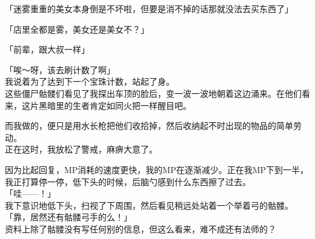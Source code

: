 「迷雾重重的美女本身倒是不坏啦，但要是消不掉的话那就没法去买东西了」

「店里全都是雾，美女还是美女不？」

「前辈，跟大叔一样」

「唉～呀，该去刷计数了啊」\\

我说着为了达到下一个宝珠计数，站起了身。\\

这些僵尸骷髅们看见了我探出车顶的脸后，变一波一波地朝着这边涌来。在他们看来，这片黑暗里的生者肯定如同火把一样醒目吧。

而我做的，便只是用水长枪把他们收拾掉，然后收纳起不时出现的物品的简单劳动。\\

正在这时，我放松了警戒，麻痹大意了。

因为比起回复，MP消耗的速度更快，我的MP在逐渐减少。正在我MP下到一半，我正打算停一停，低下头的时候，后脑勺感到什么东西擦了过去。\\

「哇——！」\\

我下意识地低下头，扫视了下周围，然后看见稍远处站着一个举着弓的骷髅。\\

「靠，居然还有骷髅弓手的么！」\\

资料上除了骷髅没有写任何别的信息，但这么看来，难不成还有法师的？

